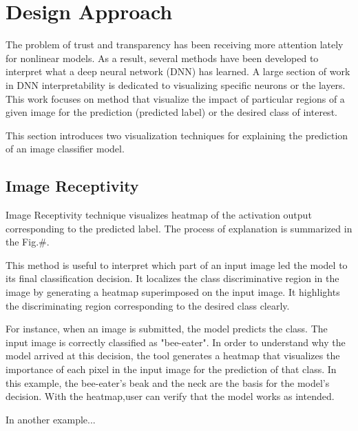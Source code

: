 

\section{Design Approach}

The problem of trust and transparency has been receiving more attention lately for nonlinear models. As a result, several methods have been developed to interpret what a deep neural network (DNN) has learned. A large section of work in DNN interpretability is dedicated to visualizing specific neurons or the layers. This work focuses on method that visualize the impact of particular regions of a given image for the prediction (predicted label) or the desired class of interest.

This section introduces two visualization techniques for explaining the prediction of an image classifier model.

\subsection{Image Receptivity}

Image Receptivity technique visualizes heatmap of the activation output corresponding to the predicted label. The process of explanation is summarized in the Fig.#.

This method is useful to interpret which part of an input image led the model to its final classification decision. It localizes the class discriminative region in the image by generating a heatmap superimposed on the input image. It highlights the discriminating region corresponding to the desired class clearly.


For instance, when an image is submitted, the model predicts the class. The input image is correctly classified as "bee-eater". In order to understand why the model arrived at this decision, the tool generates a heatmap that visualizes the importance of each pixel in the input image for the prediction of that class. In this example, the bee-eater's beak and the neck are the basis for the model's decision. With the heatmap,user can verify that the model works as intended.

In another example...

